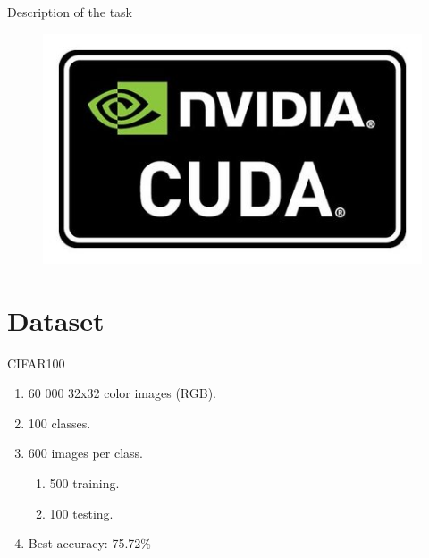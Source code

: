 \documentclass{beamer}
\begin{document}
\begin{frame}[fragile]{Description of the task}
\begin{figure}[H]
  \includegraphics[scale=0.1]{img/cuda.jpg}
 \end{figure}

\end{frame}

\section{Dataset}
\begin{frame}[fragile]{CIFAR100}
 \begin{enumerate}
  \item<+-> 60 000 32x32 color images (RGB).
  \item<+-> 100 classes.
  \item<+-> 600 images per class.
        \begin{enumerate}
         \item<+-> 500 training.
         \item<+-> 100 testing.
        \end{enumerate}
  \item<+-> Best accuracy: 75.72\%
 \end{enumerate}

\end{frame}
\end{document}
